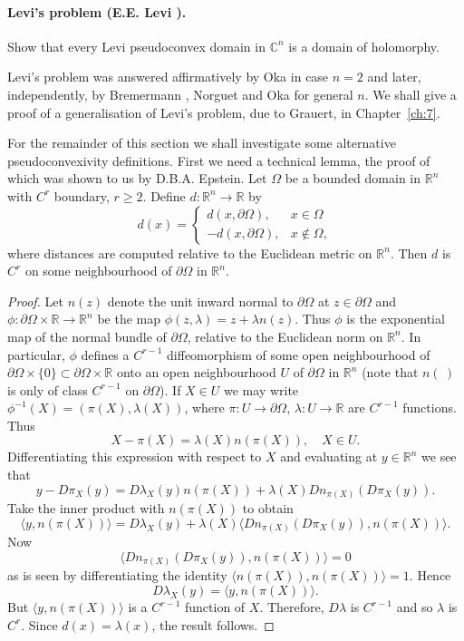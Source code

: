 \paragraph*{Levi's problem (E.E. Levi \cite{bib:I:levi-e-e:1}).} Show that every Levi pseudoconvex domain in $\mathbb C^n$ is a domain of holomorphy.

Levi's problem was answered affirmatively by Oka \cite{bib:I:oka-k:1} in case $n=2$ and later, independently, by Bremermann \cite{bib:I:bremermann-h-j:1}, Norguet \cite{bib:I:norgeut-f:1} and Oka \cite{bib:I:oka-k:2} for general $n$. We shall give a proof of a generalisation of Levi's problem, due to Grauert, in Chapter~\ref{ch:7}.

For the remainder of this section we shall investigate some alternative pseudoconvexivity definitions. First we need a technical lemma, the proof of which was shown to us by D.B.A. Epstein.
 Let $\Omega$ be a bounded domain in $\mathbb R^n$ with $C^r$ boundary, $r\geq2$. Define $d:\mathbb R^n\to\mathbb R$ by
\[d(x)=\begin{cases}d(x,\partial\Omega),&x\in\Omega\\-d(x,\partial\Omega),&x\notin\Omega,\end{cases}\]
where distances are computed relative to the Euclidean metric on $\mathbb R^n$. Then $d$ is $C^r$ on some neighbourhood of $\partial\Omega$ in $\mathbb R^n$.
\begin{proof}
Let $n(z)$ denote the unit inward normal to $\partial\Omega$ at $z\in\partial\Omega$ and $\phi:\partial\Omega\times\mathbb R\to\mathbb R^n$ be the map $\phi(z,\lambda)=z+\lambda n(z)$. Thus $\phi$ is the exponential map of the normal bundle of $\partial\Omega$, relative to the Euclidean norm on $\mathbb R^n$. In particular, $\phi$ defines a $C^{r-1}$ diffeomorphism of some open neighbourhood of $\partial\Omega\times\{0\}\subset\partial\Omega\times\mathbb R$ onto an open neighbourhood $U$ of $\partial\Omega$ in $\mathbb R^n$ (note that $n(\ )$ is only of class $C^{r-1}$ on $\partial\Omega$). If $X\in U$ we may write $\phi^{-1}(X)=(\pi(X),\lambda(X))$, where $\pi:U\to\partial\Omega$, $\lambda:U\to\mathbb R$ are $C^{r-1}$ functions. Thus
\[X-\pi(X)=\lambda(X)n(\pi(X)),\quad X\in U.\]
Differentiating this expression with respect to $X$ and evaluating at $y\in\mathbb R^n$ we see that
\[y-D\pi_X(y)=D\lambda_X(y)n(\pi(X))+\lambda(X)Dn_{\pi(X)}(D\pi_X(y)).\]
Take the inner product with $n(\pi(X))$ to obtain
\[\langle y,n(\pi(X))\rangle=D\lambda_X(y)+\lambda(X)\langle Dn_{\pi(X)}(D\pi_X(y)),n(\pi(X))\rangle.\]
Now
\[\langle Dn_{\pi(X)}(D\pi_X(y)),n(\pi(X))\rangle=0\]
as is seen by differentiating the identity $\langle n(\pi(X)),n(\pi(X))\rangle=1$. Hence
\[D\lambda_X(y)=\langle y,n(\pi(X))\rangle.\]
But $\langle y,n(\pi(X))\rangle$ is a $C^{r-1}$ function of $X$. Therefore, $D\lambda$ is $C^{r-1}$ and so $\lambda$ is $C^r$. Since $d(x)=\lambda(x)$, the result follows.
\end{proof}
